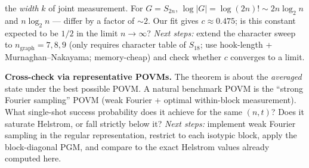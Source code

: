 \documentclass[11pt]{article}
\begin{document}
\begin{description}
        the \emph{width} $k$ of joint measurement.  For $G = S_{2n}$,
        $\log|G| = \log(2n)! \sim 2n\log_2 n$ and $n\log_2 n$ ---
        differ by a factor of $\sim 2$.  Our fit gives $c\approx 0.475$;
        is this constant expected to be $1/2$ in the limit
        $n\to\infty$? \emph{Next steps:} extend the character sweep
        to $n_{\text{graph}} = 7,8,9$ (only requires character table
        of $S_{18}$; use hook-length + Murnaghan--Nakayama; memory-cheap)
        and check whether $c$ converges to a limit.
  \item[Q5.] \textbf{Cross-check via representative POVMs.}  The
        theorem is about the \emph{averaged} state under the best
        possible POVM.  A natural benchmark POVM is the ``strong
        Fourier sampling'' POVM (weak Fourier + optimal within-block
        measurement).  What single-shot success probability does it
        achieve for the same $(n,t)$?  Does it saturate Helstrom, or
        fall strictly below it?  \emph{Next steps:} implement weak
        Fourier sampling in the regular representation, restrict to
        each isotypic block, apply the block-diagonal PGM, and
        compare to the exact Helstrom values already computed here.
\end{description}
\end{document}
